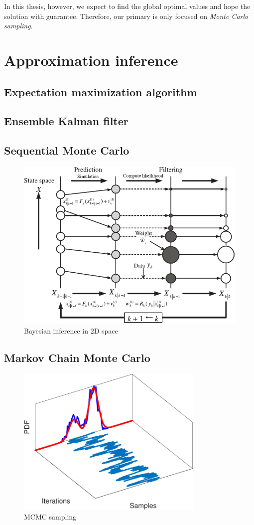 In this thesis, however, we expect to find the global optimal values and hope the solution with guarantee. Therefore, our primary is only focused on \textit{Monte Carlo sampling}. 


\section{Approximation inference}

\subsection{Expectation maximization algorithm}

\subsection{Ensemble Kalman filter}
\subsection{Sequential Monte Carlo}
\begin{figure}[htbp]
    \centering
    \includegraphics[width = 140mm]{Figures/figure-particle filter.pdf}
    \caption{Bayesian inference in 2D space}
    \label{fig: particle filter}
\end{figure}

\subsection{Markov Chain Monte Carlo}
\begin{figure}[htbp]
    \centering
    \includegraphics[width = 90mm]{Figures/figure-MCMC_sampling.pdf}
    \caption{\acrshort{MCMC} sampling}
    \label{fig: MCMC_sample}
\end{figure}


